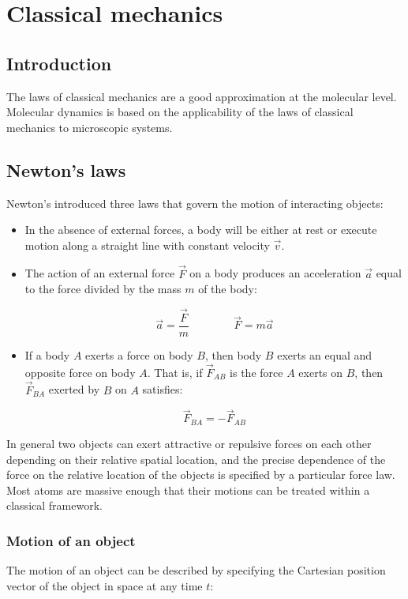 \chapter{Classical mechanics}

\section{Introduction}
The laws of classical mechanics are a good approximation at the molecular level.
Molecular dynamics is based on the applicability of the laws of classical mechanics to microscopic systems.

\section{Newton's laws}
Newton's introduced three laws that govern the motion of interacting objects:

\begin{itemize}
	\item In the absence of external forces, a body will be either at rest or execute motion along a straight line with constant velocity $\vec{v}$.
	\item The action of an external force $\vec{F}$ on a body produces an acceleration $\vec{a}$ equal to the force divided by the mass $m$ of the body:

		$$\vec{a} = \frac{\vec{F}}{m}\qquad\qquad \vec{F} = m\vec{a}$$

	\item If a body $A$ exerts a force on body $B$, then body $B$ exerts an equal and opposite force on body $A$.
		That is, if $\vec{F}_{AB}$ is the force $A$ exerts on $B$, then $\vec{F}_{BA}$ exerted by $B$ on $A$ satisfies:

		$$\vec{F}_{BA} = -\vec{F}_{AB}$$

\end{itemize}

In general two objects can exert attractive or repulsive forces on each other depending on their relative spatial location, and the precise dependence of the force on the relative location of the objects is specified by a particular force law.
Most atoms are massive enough that their motions can be treated within a classical framework.

	\subsection{Motion of an object}
	The motion of an object can be described by specifying the Cartesian position vector of the object in space at any time $t$:

